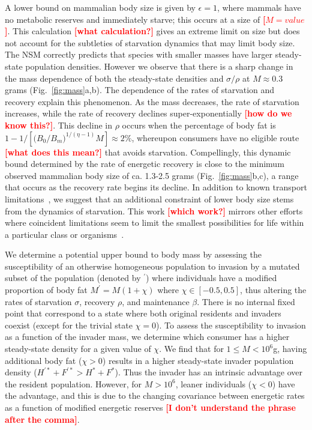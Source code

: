 \documentclass{pnastwo}
\newcommand{\sid}[1]{\textcolor{red}{\bf [#1]}}
\begin{document}
\begin{article}
A lower bound on mammalian body size is given by $\epsilon=1$, where mammals
have no metabolic reserves and immediately starve; this occurs at a size of
\sid{$M=value$}.  This calculation \sid{what calculation?} gives an extreme
limit on size but does not account for the subtleties of starvation dynamics
that may limit body size. The NSM correctly predicts that species with
smaller masses have larger steady-state population densities.  However we
observe that there is a sharp change in the mass dependence of both the
steady-state densities and $\sigma/\rho$ at $M \approx 0.3$ grams
(Fig.~\ref{fig:mass}a,b).  The dependence of the rates of starvation and
recovery explain this phenomenon.  As the mass decreases, the rate of
starvation increases, while the rate of recovery declines super-exponentially
\sid{how do we know this?}.  This decline in $\rho$ occurs when the
percentage of body fat is
$1 - 1/\left[\big(B_{0}/B_{m}\big)^{1/\left(\eta-1\right)}M\right] \approx
2\%$,
whereupon consumers have no eligible route \sid{what does this mean?} that avoids
starvation.  Compellingly, this dynamic bound determined by the rate of
energetic recovery is close to the minimum observed mammalian body size of
ca. 1.3-2.5 grams (Fig.~\ref{fig:mass}b,c), a range that occurs as the
recovery rate begins its decline.  In addition to known transport
limitations~\cite{West:2002ud}, we suggest that an additional constraint of
lower body size stems from the dynamics of starvation.  This work \sid{which
  work?} mirrors other efforts where coincident limitations seem to limit the
smallest possibilities for life within a particular class or
organisms~\cite{kempes}.

We determine a potential upper bound to body mass by assessing the
susceptibility of an otherwise homogeneous population to invasion by a
mutated subset of the population (denoted by ${}^\prime$) where individuals
have a modified proportion of body fat $M^\prime=M(1+\chi)$ where
$\chi \in [-0.5,0.5]$, thus altering the rates of starvation $\sigma$,
recovery $\rho$, and maintenance $\beta$.  There is no internal fixed point
that correspond to a state where both original residents and invaders coexist
(except for the trivial state $\chi=0$).  To assess the susceptibility to
invasion as a function of the invader mass, we determine which consumer has a
higher steady-state density for a given value of $\chi$.  We find that for
$1\leq M<10^6$g, having additional body fat ($\chi > 0$) results in a higher
steady-state invader population density
($H^{\prime *}+F^{\prime *}>H^*+F^*$).  Thus the invader has an intrinsic
advantage over the resident population.  However, for $M>10^6$, leaner
individuals ($\chi < 0$) have the advantage, and this is due to the changing
covariance between energetic rates as a function of modified energetic
reserves \sid{I don't understand the phrase after the comma}.


\end{article}
\end{document}
